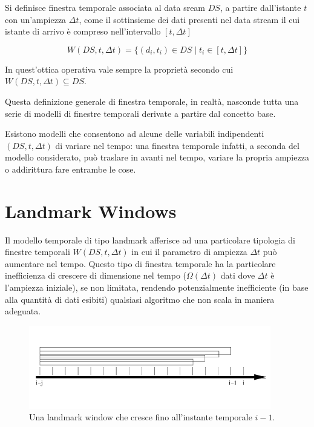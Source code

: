 \begin{defn}
Si definisce finestra temporale associata al data sream \( DS \), a partire dall'istante \( t \) con un'ampiezza $\Delta t$, come il sottinsieme dei dati presenti nel data stream il cui istante di arrivo {\`e} compreso nell'intervallo $[t,\Delta t]$

\begin{equation}
W(DS,t,\Delta t) = \lbrace (d_i,t_i) \in DS \mid t_i \in [t,\Delta t]\rbrace
\end{equation}
\end{defn}

In quest'ottica operativa vale sempre la propriet{\`a} secondo cui \\ $W(DS,t,\Delta t) \subseteq DS$.

Questa definizione generale di finestra temporale, in realt{\`a}, nasconde tutta una serie di modelli di finestre temporali derivate a partire dal concetto base.

Esistono modelli che consentono ad alcune delle variabili indipendenti $(DS,t,\Delta t)$ di variare nel tempo: una finestra temporale infatti, a seconda del modello considerato, pu{\`o} traslare in avanti nel tempo, variare la propria ampiezza o addirittura fare entrambe le cose.

\section{Landmark Windows}

Il modello temporale di tipo landmark afferisce ad una particolare tipologia di finestre temporali $W(DS,t,\Delta t)$ in cui il parametro di ampiezza $\Delta t$ pu{\`o} aumentare nel tempo. Questo tipo di finestra temporale ha la particolare inefficienza di crescere di dimensione nel tempo ($\Omega(\Delta t)$ dati dove $\Delta t$ {\`e} l'ampiezza iniziale), se non limitata, rendendo potenzialmente inefficiente (in base alla quantit{\`a} di dati esibiti) qualsiasi algoritmo che non scala in maniera adeguata.

\begin{figure}\centering
\includegraphics[scale=0.70]{img/landmark-windows}
\caption{Una landmark window che cresce fino all'instante temporale \( i-1 \).}
\end{figure}

